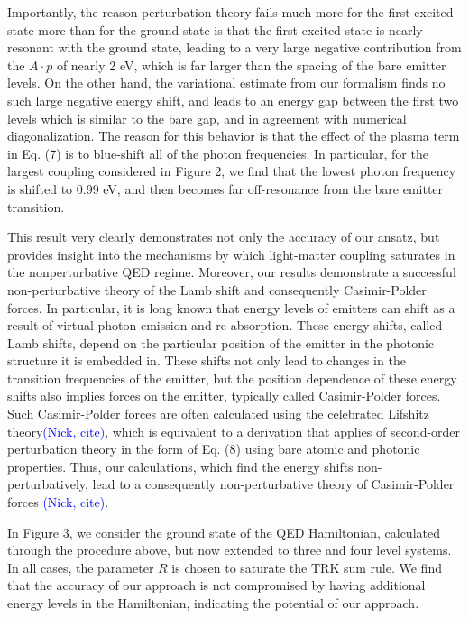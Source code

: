 \documentclass[aps,prl,twocolumn,
	groupedaddress,superscriptaddress,
	amsfonts,amssymb,amsmath,floatfix,
	citeautoscript]{revtex4-1}
\newcommand{\Jadd}[1]{\textcolor{blue}{#1}}
\begin{document}
Importantly, the reason perturbation theory fails much more for the first excited state more than for the ground state is that the first excited state is nearly resonant with the ground state, leading to a very large negative contribution from the $A\cdot p$ of nearly 2 eV, which is far larger than the spacing of the bare emitter levels. On the other hand, the variational estimate from our formalism finds no such large negative energy shift, and leads to an energy gap between the first two levels which is similar to the bare gap, and in agreement with numerical diagonalization. The reason for this behavior is that the effect of the plasma term in Eq. (7) is to blue-shift all of the photon frequencies. In particular, for the largest coupling considered in Figure 2, we find that the lowest photon frequency is shifted to 0.99 eV, and then becomes far off-resonance from the bare emitter transition. 

This result very clearly demonstrates not only the accuracy of our ansatz, but provides insight into the mechanisms by which light-matter coupling saturates in the nonperturbative QED regime. Moreover, our results demonstrate a successful non-perturbative theory of the Lamb shift and consequently Casimir-Polder forces. In particular, it is long known that energy levels of emitters can shift as a result of virtual photon emission and re-absorption. These energy shifts, called Lamb shifts, depend on the particular position of the emitter in the photonic structure it is embedded in. These shifts not only lead to changes in the transition frequencies of the emitter, but the position dependence of these energy shifts also implies forces on the emitter, typically called Casimir-Polder forces. Such Casimir-Polder forces are often calculated using the celebrated Lifshitz theory\Jadd{(Nick, cite)}, which is equivalent to a derivation that applies of second-order perturbation theory in the form of Eq. (8) using bare atomic and photonic properties. Thus, our calculations, which find the energy shifts non-perturbatively, lead to a consequently non-perturbative theory of Casimir-Polder forces \Jadd{(Nick, cite)}. 

In Figure 3, we consider the ground state of the QED Hamiltonian, calculated through the procedure above, but now extended to three and four level systems. In all cases, the parameter $R$ is chosen to saturate the TRK sum rule. We find that the accuracy of our approach is not compromised by having additional energy levels in the Hamiltonian, indicating the potential of our approach.
\end{document}
